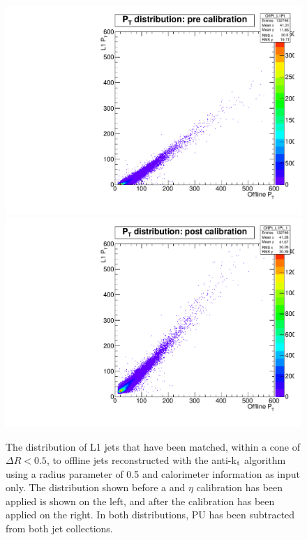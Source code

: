 \begin{figure}[t!]
\begin{center}
  \includegraphics[scale=0.32]{Figures/l1jets/PreCalib.pdf}
  \includegraphics[scale=0.32]{Figures/l1jets/PostCalib.pdf}
\caption{The \pt distribution of \ac{L1} jets that have been matched, within a cone of $\Delta R<0.5$, to offline jets reconstructed with the anti-k$_{\rm t}$ algorithm using a radius parameter of 0.5 and calorimeter information as input only. The distribution shown before a \pt and $\eta$ calibration has been applied is shown on the left, and after the calibration has been applied on the right. In both distributions, \ac{PU} has been subtracted from both jet collections. }
\label{prepostCalib}
\end{center}
\end{figure}



